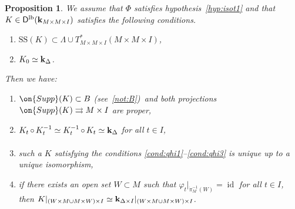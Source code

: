 \documentclass[12pt,leqno]{article}
\newtheorem{proposition}[theorem]{Proposition}
\theoremstyle{definition}
\def\phi{{\varphi}}
\newcommand{\cor}{{\bf k}}
\newcommand{\tto}{\rightrightarrows}
\newcommand{\conv}[1][]{\mathop{\circ}\limits_{#1}}
\newcommand{\opb}[1]{#1^{-1}}
\newcommand{\lp}{{\rm(}}
\newcommand{\rp}{{\rm)}}
\newcommand{\bnum}{\begin{enumerate}[{\rm(i)}]}
\newcommand{\enum}{\end{enumerate}}
\newcommand{\banum}{\begin{enumerate}[{\rm(a)}]}
\newcommand{\eanum}{\end{enumerate}}
\DeclareMathOperator{\id}{id}
\newcommand{\Supp}{\on{Supp}}
\newcommand{\Der}[1][]{\mathsf{D}^{#1}}
\newcommand{\Derlb}{\Der[\mathrm{lb}]}
\newcommand{\SSi}{\mathrm{SS}}
\numberwithin{equation}{section}
\begin{document}
\begin{proposition}\label{prop:support_unicity}
We assume that $\Phi$ satisfies hypothesis~\eqref{hyp:isot1}
and that 
$K\in\Derlb(\cor_{M\times M\times I})$ satisfies the following conditions.
\banum
\item
$\SSi(K)\subset\Lambda\cup T^*_{M\times M\times I}(M\times M\times I)$,
\label{cond:qhi1}
\item
$K_0\simeq \cor_\Delta$.
\label{cond:qhi3}
\eanum
Then we have:
\bnum
\item
$\Supp(K) \subset B$ \lp see~\eqref{not:B}\rp\,
and both projections $\Supp(K)\tto M\times I$ are proper,
\item
$K_t\conv\opb{K_t}\simeq \opb{K_t}\conv K_t\simeq \cor_\Delta$
for all $t\in I$,
\item
such a $K$ satisfying the conditions
\eqref{cond:qhi1}--\eqref{cond:qhi3} is unique up to a unique isomorphism,
\item
if there exists an open set $W\subset M$ such that
$\phi_t|_{\opb{\dot\pi_M}(W)} = \id$ for all $t\in I$, then
$K|_{(W\times M \cup M\times W)\times I}
\simeq \cor_{\Delta\times I}|_{(W\times M \cup M\times W)\times I}$.
\enum
\end{proposition}
\end{document}

